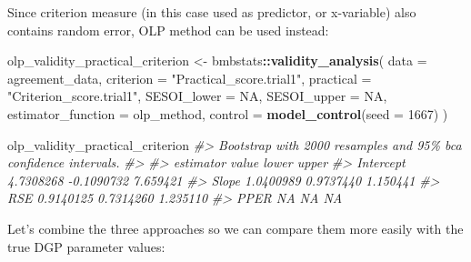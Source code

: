 \documentclass[
]{book}
\newenvironment{Shaded}{\begin{snugshade}}{\end{snugshade}}
\newcommand{\CommentTok}[1]{\textcolor[rgb]{0.56,0.35,0.01}{\textit{#1}}}
\newcommand{\DataTypeTok}[1]{\textcolor[rgb]{0.13,0.29,0.53}{#1}}
\newcommand{\DecValTok}[1]{\textcolor[rgb]{0.00,0.00,0.81}{#1}}
\newcommand{\KeywordTok}[1]{\textcolor[rgb]{0.13,0.29,0.53}{\textbf{#1}}}
\newcommand{\NormalTok}[1]{#1}
\newcommand{\OperatorTok}[1]{\textcolor[rgb]{0.81,0.36,0.00}{\textbf{#1}}}
\newcommand{\OtherTok}[1]{\textcolor[rgb]{0.56,0.35,0.01}{#1}}
\newcommand{\StringTok}[1]{\textcolor[rgb]{0.31,0.60,0.02}{#1}}
\begin{document}
Since criterion measure (in this case used as predictor, or x-variable) also contains random error, OLP method can be used instead:

\begin{Shaded}
\begin{Highlighting}[]
\NormalTok{olp\_validity\_practical\_criterion <{-}}\StringTok{ }\NormalTok{bmbstats}\OperatorTok{::}\KeywordTok{validity\_analysis}\NormalTok{(}
  \DataTypeTok{data =}\NormalTok{ agreement\_data,}
  \DataTypeTok{criterion =} \StringTok{"Practical\_score.trial1"}\NormalTok{,}
  \DataTypeTok{practical =} \StringTok{"Criterion\_score.trial1"}\NormalTok{,}
  \DataTypeTok{SESOI\_lower =} \OtherTok{NA}\NormalTok{,}
  \DataTypeTok{SESOI\_upper =} \OtherTok{NA}\NormalTok{,}
  \DataTypeTok{estimator\_function =}\NormalTok{ olp\_method,}
  \DataTypeTok{control =} \KeywordTok{model\_control}\NormalTok{(}\DataTypeTok{seed =} \DecValTok{1667}\NormalTok{)}
\NormalTok{)}

\NormalTok{olp\_validity\_practical\_criterion}
\CommentTok{\#> Bootstrap with 2000 resamples and 95\% bca confidence intervals.}
\CommentTok{\#> }
\CommentTok{\#>  estimator     value      lower    upper}
\CommentTok{\#>  Intercept 4.7308268 {-}0.1090732 7.659421}
\CommentTok{\#>      Slope 1.0400989  0.9737440 1.150441}
\CommentTok{\#>        RSE 0.9140125  0.7314260 1.235110}
\CommentTok{\#>       PPER        NA         NA       NA}
\end{Highlighting}
\end{Shaded}

Let's combine the three approaches so we can compare them more easily with the true DGP parameter values:
\end{document}

